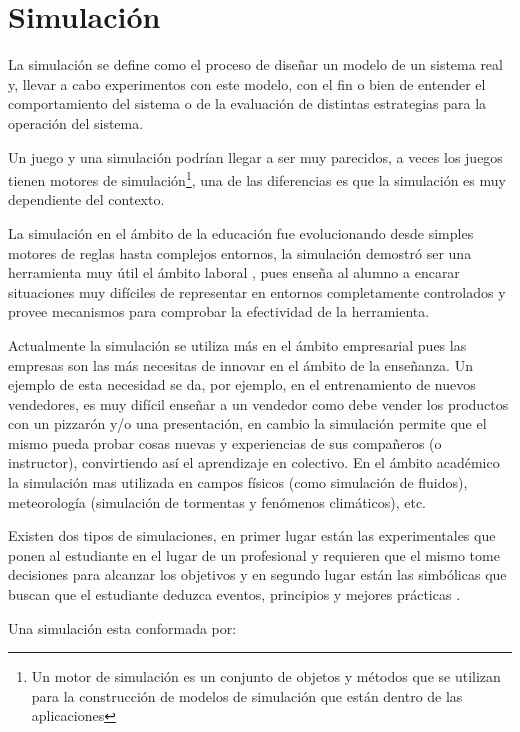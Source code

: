 \section{Simulación}
\label{sec:tics_SIMULACION}

La simulación se define como el proceso de diseñar un modelo de un sistema real
y, llevar a cabo experimentos con este modelo, con el fin o bien de entender el
comportamiento del sistema o de la evaluación de distintas estrategias para la
operación del sistema\cite{ingalls2008introduction}. 

Un juego y una simulación podrían llegar a ser muy parecidos, a veces los juegos
tienen motores de simulación\footnote{Un motor de simulación es un conjunto de
objetos y métodos que se utilizan para la construcción de modelos de
simulación que están dentro de las aplicaciones}, una de las diferencias
es que la simulación es muy dependiente del contexto. 

La simulación en el ámbito de la educación fue evolucionando desde simples
motores de reglas hasta complejos entornos, la simulación demostró ser una
herramienta muy útil el ámbito laboral \cite{mariluz:seiousgames}, pues enseña
al alumno a encarar situaciones muy difíciles de representar en entornos
completamente controlados y provee mecanismos para comprobar la efectividad de
la herramienta. 

Actualmente la simulación se utiliza más en el ámbito empresarial pues las
empresas son las más necesitas de innovar en el ámbito de la enseñanza. Un
ejemplo de esta necesidad se da, por ejemplo, en el entrenamiento de nuevos
vendedores, es muy difícil enseñar a un vendedor como debe vender los productos
con un pizzarón y/o una presentación, en cambio la simulación permite que el
mismo pueda probar cosas nuevas y experiencias de sus compañeros (o instructor),
convirtiendo así el aprendizaje en colectivo\cite{mariluz:seiousgames}. En el
ámbito académico la simulación mas utilizada en campos físicos (como simulación
de fluidos), meteorología (simulación de tormentas y fenómenos climáticos), etc. 

Existen dos tipos de simulaciones, en primer lugar están las experimentales que
ponen al estudiante en el lugar de un profesional y requieren que el mismo tome
decisiones para alcanzar los objetivos y en segundo lugar están las simbólicas
que buscan que el estudiante deduzca eventos, principios y mejores prácticas
\cite{charsky:2010}. 

Una simulación esta conformada por:

